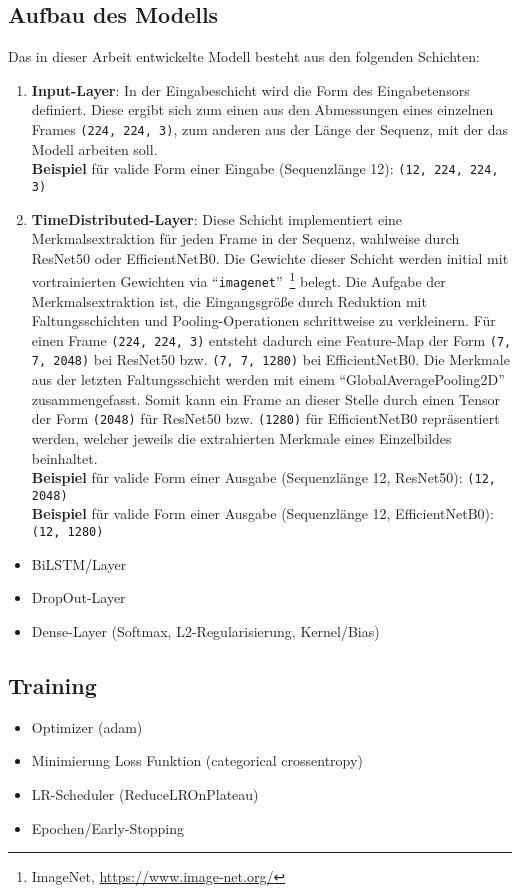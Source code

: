 \documentclass{article}
\newcommand{\imgsize}{\texttt{(224, 224, 3)}\xspace}
\newcommand{\resnet}{ResNet50\xspace}
\newcommand{\effnet}{EfficientNetB0\xspace}
\begin{document}
    \subsection{Aufbau des Modells}
    Das in dieser Arbeit entwickelte Modell besteht aus den folgenden Schichten:
    \begin{enumerate}
        \item\textbf{Input-Layer}:
            In der Eingabeschicht wird die Form des Eingabetensors definiert.
            Diese ergibt sich zum einen aus den Abmessungen eines einzelnen Frames \imgsize, zum anderen aus der Länge der Sequenz, mit der das Modell arbeiten soll.
            \\\textbf{Beispiel} für valide Form einer Eingabe (Sequenzlänge 12): \texttt{(12, 224, 224, 3)}
        \item\textbf{TimeDistributed-Layer}:
            Diese Schicht implementiert eine Merkmalsextraktion für jeden Frame in der Sequenz, wahlweise durch \resnet oder \effnet.
            Die Gewichte dieser Schicht werden initial mit vortrainierten Gewichten via \enquote{\texttt{imagenet}}~\footnote{ImageNet, \url{https://www.image-net.org/}} belegt.
            Die Aufgabe der Merkmalsextraktion ist, die Eingangsgröße durch Reduktion mit Faltungsschichten und Pooling-Operationen schrittweise zu verkleinern.
            Für einen Frame \imgsize entsteht dadurch eine Feature-Map der Form \texttt{(7, 7, 2048)} bei \resnet bzw. \texttt{(7, 7, 1280)} bei \effnet.
            Die Merkmale aus der letzten Faltungsschicht werden mit einem \enquote{GlobalAveragePooling2D} zusammengefasst.
            Somit kann ein Frame an dieser Stelle durch einen Tensor der Form \texttt{(2048)} für \resnet bzw. \texttt{(1280)} für \effnet repräsentiert werden, welcher jeweils die extrahierten Merkmale eines Einzelbildes beinhaltet.
            \\\textbf{Beispiel} für valide Form einer Ausgabe (Sequenzlänge 12, \resnet): \texttt{(12, 2048)}
            \\\textbf{Beispiel} für valide Form einer Ausgabe (Sequenzlänge 12, \effnet): \texttt{(12, 1280)}
    \end{enumerate}
    \begin{itemize}
        \item BiLSTM/Layer
        \item DropOut-Layer
        \item Dense-Layer (Softmax, L2-Regularisierung, Kernel/Bias)
    \end{itemize}
    \subsection{Training}
    \begin{itemize}
        \item Optimizer (adam)
        \item Minimierung Loss Funktion (categorical crossentropy)
        \item LR-Scheduler (ReduceLROnPlateau)
        \item Epochen/Early-Stopping
    \end{itemize}
\end{document}

